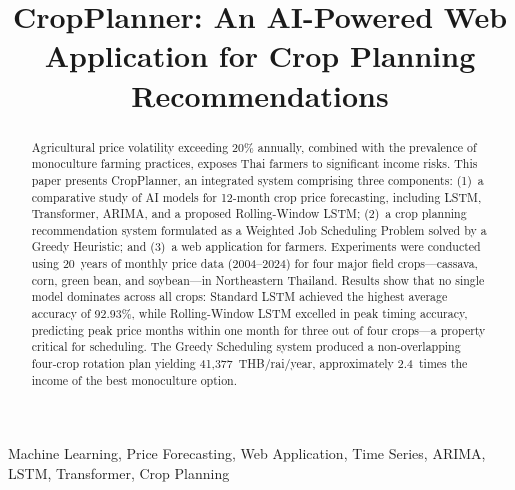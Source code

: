 \documentclass[conference]{IEEEtran}
\begin{document}
\title{CropPlanner: An AI-Powered Web Application for Crop Planning Recommendations}

\author{
}

\maketitle

\begin{abstract}
Agricultural price volatility exceeding 20\% annually, combined with the prevalence of monoculture farming practices, exposes Thai farmers to significant income risks. This paper presents CropPlanner, an integrated system comprising three components: (1)~a comparative study of AI models for 12-month crop price forecasting, including LSTM, Transformer, ARIMA, and a proposed Rolling-Window LSTM; (2)~a crop planning recommendation system formulated as a Weighted Job Scheduling Problem solved by a Greedy Heuristic; and (3)~a web application for farmers. Experiments were conducted using 20~years of monthly price data (2004--2024) for four major field crops---cassava, corn, green bean, and soybean---in Northeastern Thailand. Results show that no single model dominates across all crops: Standard LSTM achieved the highest average accuracy of 92.93\%, while Rolling-Window LSTM excelled in peak timing accuracy, predicting peak price months within one month for three out of four crops---a property critical for scheduling. The Greedy Scheduling system produced a non-overlapping four-crop rotation plan yielding 41,377~THB/rai/year, approximately 2.4~times the income of the best monoculture option.
\end{abstract}

\begin{IEEEkeywords}
Machine Learning, Price Forecasting, Web Application, Time Series, ARIMA, LSTM, Transformer, Crop Planning
\end{IEEEkeywords}

\end{document}
